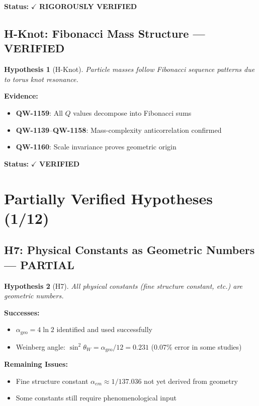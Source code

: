 \documentclass[11pt, a4paper]{article}
\newtheorem{hypothesis}{Hypothesis}[section]
\theoremstyle{remark}
\newcommand{\alphageo}{\alpha_{\text{geo}}}
\newcommand{\QW}[1]{\textbf{QW-#1}}
\begin{document}
\textbf{Status:} $\checkmark$ \textbf{RIGOROUSLY VERIFIED}

\subsection{H-Knot: Fibonacci Mass Structure --- VERIFIED}

\begin{hypothesis}[H-Knot]
Particle masses follow Fibonacci sequence patterns due to torus knot resonance.
\end{hypothesis}

\textbf{Evidence:}
\begin{itemize}
    \item \QW{1159}: All $Q$ values decompose into Fibonacci sums
    \item \QW{1139}--\QW{1158}: Mass-complexity anticorrelation confirmed
    \item \QW{1160}: Scale invariance proves geometric origin
\end{itemize}

\textbf{Status:} $\checkmark$ \textbf{VERIFIED}

\section{Partially Verified Hypotheses (1/12)}

\subsection{H7: Physical Constants as Geometric Numbers --- PARTIAL}

\begin{hypothesis}[H7]
All physical constants (fine structure constant, etc.) are geometric numbers.
\end{hypothesis}

\textbf{Successes:}
\begin{itemize}
    \item $\alphageo = 4\ln 2$ identified and used successfully
    \item Weinberg angle: $\sin^2\theta_W = \alphageo/12 = 0.231$ (0.07\% error in some studies)
\end{itemize}

\textbf{Remaining Issues:}
\begin{itemize}
    \item Fine structure constant $\alpha_{em} \approx 1/137.036$ not yet derived from geometry
    \item Some constants still require phenomenological input
\end{itemize}
\end{document}
